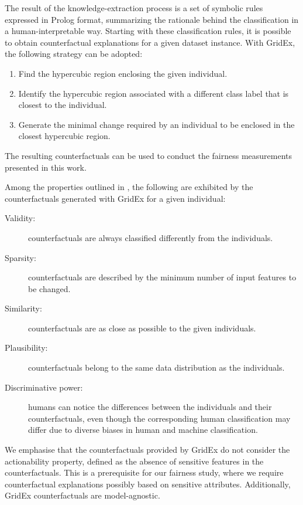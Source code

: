 \documentclass[letterpaper]{article} %
\begin{document}
The result of the knowledge-extraction process is a set of symbolic rules expressed in Prolog format, summarizing the rationale behind the classification in a human-interpretable way.
%
Starting with these classification rules, it is possible to obtain counterfactual explanations for a given dataset instance. With GridEx, the following strategy can be adopted:
%
\begin{enumerate}
	\item Find the hypercubic region enclosing the given individual.
	\item Identify the hypercubic region associated with a different class label that is closest to the individual.
	\item Generate the minimal change required by an individual to be enclosed in the closest hypercubic region.
\end{enumerate}

The resulting counterfactuals can be used to conduct the fairness measurements presented in this work.

Among the properties outlined in \cite{guidotti2022counterfactual}, the following are exhibited by the counterfactuals generated with GridEx for a given individual:
%
\begin{description}
	\item[Validity:] counterfactuals are always classified differently from the individuals.
	\item[Sparsity:] counterfactuals are described by the minimum number of input features to be changed.
	\item[Similarity:] counterfactuals are as close as possible to the given individuals.
	\item[Plausibility:] counterfactuals belong to the same data distribution as the individuals.
	\item[Discriminative power:] humans can notice the differences between the individuals and their counterfactuals, even though the corresponding human classification may differ due to diverse biases in human and machine classification.
\end{description}

We emphasise that the counterfactuals provided by GridEx do not consider the actionability property, defined as the absence of sensitive features in the counterfactuals. This is a prerequisite for our fairness study, where we require counterfactual explanations possibly based on sensitive attributes. Additionally, GridEx counterfactuals are model-agnostic.
\end{document}
